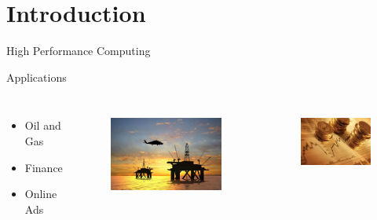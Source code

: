 \section{Introduction}



\begin{frame}{High Performance Computing}
  \vspace{0.5cm}
  \begin{beamerboxesrounded}{Applications}
    \begin{columns}[c]
      \vspace{-1.2cm}
      \begin{itemize}
      \item Oil and Gas
      \item Finance
      \item Online Ads
      \end{itemize}
      \vspace{-1.2cm}
      \begin{columns}
        \begin{figure}[ht]
          \centering
          \includegraphics[scale=0.18]{figs/oil-gas-industry.jpg}\\
        \end{figure}
        \begin{figure}[ht]
          \centering
          \includegraphics[scale=0.29, clip=true, trim=0 0 0 0]{figs/finance.jpg}\\

\end{figure}
\end{columns}
\end{columns}
\end{beamerboxesrounded}
\end{frame}
